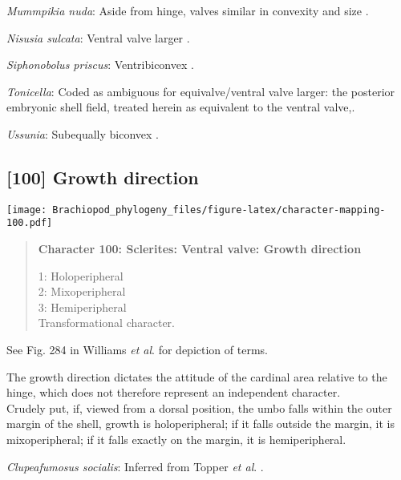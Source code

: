 \documentclass[openany]{book}
\theoremstyle{definition}
\theoremstyle{definition}
\theoremstyle{definition}
\theoremstyle{remark}
\begin{document}
\hypertarget{Mummpikia_nuda-coding-99}{}
\emph{Mummpikia nuda}: Aside from hinge, valves similar in convexity and
size \citep{Balthasar2008iMummpikia}.

\hypertarget{Nisusia_sulcata-coding-99}{}
\emph{Nisusia sulcata}: Ventral valve larger \citep[see][fig.
126.]{Williams2000LinguliformeaCraniiformea}.

\hypertarget{Siphonobolus_priscus-coding-99}{}
\emph{Siphonobolus priscus}: Ventribiconvex
\citep{Popov2009Earlyontogeny}.

\hypertarget{Tonicella-coding-99}{}
\emph{Tonicella}: Coded as ambiguous for equivalve/ventral valve larger:
the posterior embryonic shell field, treated herein as equivalent to the
ventral valve,.

\hypertarget{Ussunia-coding-99}{}
\emph{Ussunia}: Subequally biconvex
\citep[p.~192]{Williams2000LinguliformeaCraniiformea}.

\subsection*{{[}100{]} Growth direction}\label{growth-direction-1}

\texttt{[image: Brachiopod\_phylogeny\_files/figure-latex/character-mapping-100.pdf]}

\begin{quote}
\textbf{Character 100: Sclerites: Ventral valve: Growth direction}

1: Holoperipheral\\
2: Mixoperipheral\\
3: Hemiperipheral\\
Transformational character.
\end{quote}

See Fig. 284 in Williams \emph{et al}.
\citeyearpar{Williams1997Introduction} for depiction of terms.

The growth direction dictates the attitude of the cardinal area relative
to the hinge, which does not therefore represent an independent
character.\\
Crudely put, if, viewed from a dorsal position, the umbo falls within
the outer margin of the shell, growth is holoperipheral; if it falls
outside the margin, it is mixoperipheral; if it falls exactly on the
margin, it is hemiperipheral.

\hypertarget{Clupeafumosus_socialis-coding-100}{}
\emph{Clupeafumosus socialis}: Inferred from Topper \emph{et al}.
\citeyearpar{Topper2013Reappraisalof}.
\end{document}
